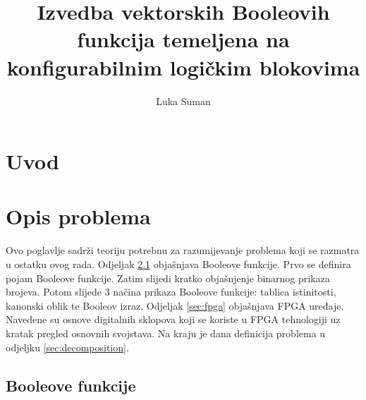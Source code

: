 \documentclass[times, utf8, diplomski]{fer}
\begin{document}

\title{Izvedba vektorskih Booleovih funkcija temeljena na konfigurabilnim logičkim blokovima}

\author{Luka Suman}

\maketitle



\zahvala{}

\tableofcontents

\chapter{Uvod} \label{chapter:introduction}


\chapter{Opis problema} \label{chapter:problem}

Ovo poglavlje sadrži teoriju potrebnu za razumijevanje problema koji se razmatra u ostatku ovog rada. Odjeljak \ref{sec:bool-func} objašnjava Booleove funkcije. Prvo se definira pojam Booleove funkcije. Zatim slijedi kratko objašnjenje binarnog prikaza brojeva. Potom slijede $3$ načina prikaza Booleove funkcije: tablica istinitosti, kanonski oblik te Booleov izraz. Odjeljak \ref{sec:fpga} objašnjava FPGA uređaje. Navedene su osnove digitalnih sklopova koji se koriste u FPGA tehnologiji uz kratak pregled osnovnih svojstava. Na kraju je dana definicija problema u odjeljku \ref{sec:decomposition}.


\section{Booleove funkcije} \label{sec:bool-func}
\end{document}
